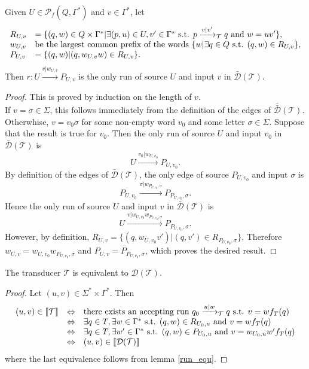 \documentclass[envcountsame]{llncs}
\newcommand\inter[1]{\llbracket #1 \rrbracket}
\newcommand\tra{\mathcal{T}}
\begin{document}
\begin{lemma}\label{run_equ}
Given $U \in \mathcal{P}_f(Q,\Gamma^*)$ and $v \in \Gamma^*$, let
$$\begin{array}{ll}
R_{U,v} & = \{(q,w) \in Q \times \Gamma^* | \exists (p,u) \in U,v'\in \Gamma^* \textup{ s.t. } p \xrightarrow{v|v'}_{\tra} q \textup{ and } w = uv'\},\\
w_{U,v} & \textup{be the largest common prefix of the words $\{ w | \exists q \in Q \textup{ s.t. } (q,w) \in R_{U,v}$} \} ,\\
P_{U,v} & = \{(q,w) | (q,w_{U,v}w) \in R_{U,v} \}.
\end{array}$$
Then $r : U \xrightarrow{v|w_{U,v}} P_{U,v}$ is the only run of source $U$ and input $v$ in $\bar{\mathcal{D}}(\tra)$.
\end{lemma}

\begin{proof}
This is proved by induction on the length of $v$.\\
If $v = \sigma \in \Sigma$, this follows immediately from the definition of the edges of $\bar{\bar{\mathcal{D}}}(\tra)$.\\
Otherwhise, $v = v_0\sigma$ for some non-empty word $v_0$ and some letter $\sigma \in \Sigma$.
Suppose that the result is true for $v_0$.
Then the only run of source $U$ and input $v_0$ in $\bar{\mathcal{D}}(\tra)$ is 
$$U \xrightarrow{v_0|w_{U,v_0}} P_{U,v_0}.$$
By definition of the edges of $\bar{\mathcal{D}}(\tra)$, the only edge of source $P_{U,v_0}$ and input $\sigma$ is $$P_{U,v_0} \xrightarrow{\sigma|w_{P_{U,v_0},\sigma}} P_{P_{U,v_0},\sigma}.$$
Hence the only run of source $U$ and input $v$ in $\bar{\mathcal{D}}(\tra)$ is 
$$U \xrightarrow{v|w_{U,v_0}w_{P_{U,v_0},\sigma}} P_{P_{U,v_0},\sigma}.$$
However, by definition, $R_{U,v} = \{ (q,w_{U,v_0}v') | (q,v') \in R_{P_{U,v_0},\sigma} \}$,
Therefore $w_{U,v} = w_{U,v_0}w_{P_{U,v_0},\sigma}$ and $P_{U,v} = P_{P_{U,v_0},\sigma}$, which proves the desired result.
\end{proof}

\begin{corollary}\label{det_equ}
The transducer $\tra$ is equivalent to $\mathcal{D}(\tra)$.
\end{corollary}

\begin{proof}
Let $(u,v) \in \Sigma^* \times \Gamma^*$.
Then
$$\begin{array}{lcl}
(u,v) \in \inter{\tra} & \Leftrightarrow & \textup{there exists an accepting run } q_0 \xrightarrow{u|w}_{\tra} q \textup{ s.t. } v = wf_T(q)\\
& \Leftrightarrow & \exists q \in T, \exists w \in \Gamma^* \textup{ s.t. } (q,w) \in R_{U_0,u} \textup{ and }v = wf_T(q)\\
& \Leftrightarrow & \exists q \in T, \exists w' \in \Gamma^* \textup{ s.t. } (q,w) \in P_{U_0,u} \textup{ and }v = w_{U_0,u}w'f_T(q)\\
& \Leftrightarrow & (u,v) \in \inter{\mathcal{D}(\tra)}\\
\end{array}$$
where the last equivalence follows from lemma \ref{run_equ}.
\end{proof}
\end{document}
